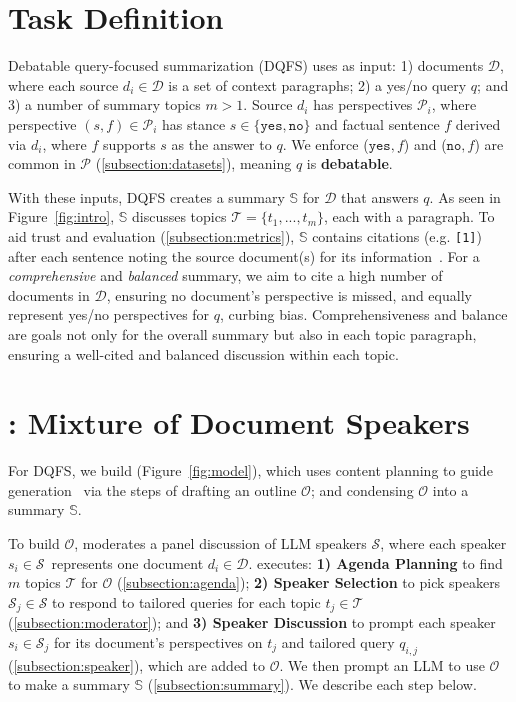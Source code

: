 \section{Task Definition} \label{section:task}

Debatable query-focused summarization (DQFS) uses as input: 1) documents $\mathcal{D}$, where each source $d_i \in \mathcal{D}$ is a set of context paragraphs; 2) a yes/no query $q$; and 3) a number of summary topics $m>1$.
Source $d_i$ has perspectives $\mathcal{P}_i$, where perspective $(s, f) \in \mathcal{P}_i$ has stance $s \in \{\texttt{yes}, \texttt{no}\}$ and factual sentence $f$ derived via $d_{i}$, where $f$ supports $s$ as the answer to $q$.
We enforce ($\texttt{yes}, f$) and ($\texttt{no}, f$) are common in $\mathcal{P}$ (\cref{subsection:datasets}), meaning $q$ is \textbf{debatable}.

With these inputs, DQFS creates a summary $\mathbb{S}$ for $\mathcal{D}$ that answers $q$.
As seen in Figure~\ref{fig:intro}, $\mathbb{S}$ discusses topics $\mathcal{T} = \{t_1, ..., t_m\}$, each with a paragraph.
To aid trust and evaluation (\ref{subsection:metrics}), $\mathbb{S}$ contains citations (e.g. \texttt{[1]}) after each sentence noting the source document(s) for its information~\cite{huang-chang-2024-citation}.
For a \textit{comprehensive} and \textit{balanced} summary, we aim to cite a high number of documents in $\mathcal{D}$, ensuring no document's perspective is missed, and equally represent yes/no perspectives for $q$, curbing bias.
Comprehensiveness and balance are goals not only for the overall summary but also in each topic paragraph, ensuring a well-cited and balanced discussion within each topic.

\section{\model: Mixture of Document Speakers} \label{section:method}

For DQFS, we build \model (Figure~\ref{fig:model}), which uses content planning to guide generation~\cite{balepur-etal-2023-expository, shao-etal-2024-assisting} via the steps of drafting an outline $\mathcal{O}$; and condensing $\mathcal{O}$ into a summary $\mathbb{S}$.

To build $\mathcal{O}$, \model moderates a panel discussion of LLM speakers $\mathcal{S}$, where each speaker $s_i \in \mathcal{S}$~represents one document $d_i \in \mathcal{D}$.
\model executes: \textbf{1) Agenda Planning} to find $m$ topics $\mathcal{T}$ for $\mathcal{O}$ (\cref{subsection:agenda}); \textbf{2) Speaker Selection} to pick speakers $\mathcal{S}_j \in \mathcal{S}$ to respond to tailored queries for each topic $t_j \in \mathcal{T}$ (\cref{subsection:moderator}); and \textbf{3) Speaker Discussion} to prompt each speaker $s_i \in \mathcal{S}_j$ for its document's perspectives on $t_j$ and tailored query $q_{i,j}$ (\cref{subsection:speaker}), which are added to $\mathcal{O}$. We then prompt an LLM to use $\mathcal{O}$ to make a summary $\mathbb{S}$ (\cref{subsection:summary}). We describe each step below. 

